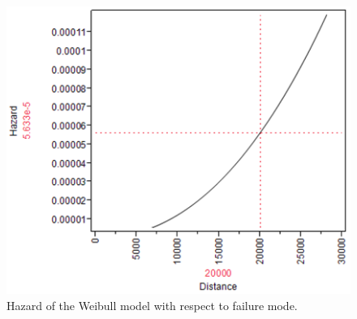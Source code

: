 \documentclass{article}
\begin{document}
\begin{enumerate}
\begin{enumerate}
  \begin{center}
        \FloatBarrier
      \begin{figure}
        \centering
        \includegraphics[width = 5in]{problem5_hazard2.png}
        \caption{Hazard of the Weibull model with respect to failure mode.}
      \end{figure}
      \FloatBarrier
  \end{center}\\

    \end{enumerate}
\end{enumerate}
\end{document}
